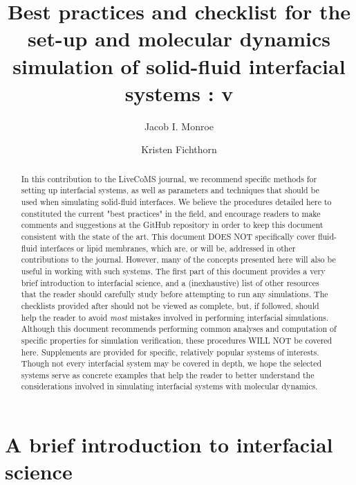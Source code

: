 \documentclass[9pt]{livecoms}
\title{Best practices and checklist for the set-up and molecular dynamics simulation of solid-fluid interfacial systems : v\versionnumber}
\author[1*\authfn{1}]{Jacob I. Monroe}
\author[2\authfn{1}]{Kristen Fichthorn}
\affil[1]{Department of Chemical Engineering, University of California, Santa Barbara}
\affil[2]{Department of Chemical Engineering, Penn State University}
\begin{document}
\maketitle

\begin{abstract}
In this contribution to the LiveCoMS journal, we recommend specific methods for setting up interfacial systems, as well as parameters and techniques that should be used when simulating solid-fluid interfaces.
We believe the procedures detailed here to constituted the current "best practices" in the field, and encourage readers to make comments and suggestions at the GitHub repository in order to keep this document consistent with the state of the art.
This document DOES NOT specifically cover fluid-fluid interfaces or lipid membranes, which are, or will be, addressed in other contributions to the journal.
However, many of the concepts presented here will also be useful in working with such systems.
The first part of this document provides a very brief introduction to interfacial science, and a (inexhaustive) list of other resources that the reader should carefully study before attempting to run any simulations.
The checklists provided after should not be viewed as complete, but, if followed, should help the reader to avoid \textit{most} mistakes involved in performing interfacial simulations.
Although this document recommends performing common analyses and computation of specific properties for simulation verification, these procedures WILL NOT be covered here.
Supplements are provided for specific, relatively popular systems of interests.
Though not every interfacial system may be covered in depth, we hope the selected systems serve as concrete examples that help the reader to better understand the considerations involved in simulating interfacial systems with molecular dynamics.
\end{abstract}


\section{A brief introduction to interfacial science}
\label{sec:Intro}
\end{document}
